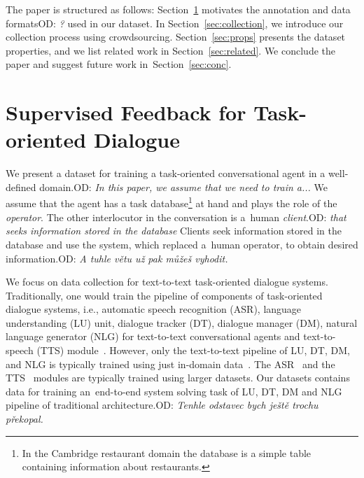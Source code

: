 \documentclass[runningheads,a4paper]{llncs}
\def\OD#1{{\color{darkgreen}OD: \it #1}}
\begin{document}
The paper is structured as follows: Section~\ref{sec:repre} motivates the annotation and data formats\OD{?} used in our dataset.
In Section~\ref{sec:collection}, we introduce our collection process using crowdsourcing.
Section~\ref{sec:props} presents the dataset properties, and we list related work in Section~\ref{sec:related}.
We conclude the paper and suggest future work in~Section~\ref{sec:conc}.


\section{Supervised Feedback for Task-oriented Dialogue} \label{sec:repre}
\vspace{-0.50em}
We present a dataset for training a task-oriented conversational agent in a well-defined domain.\OD{In this paper, we assume that we need to train a...}
We assume that the agent has a task database\footnote{In the Cambridge restaurant domain the database is a simple table containing information about restaurants.} at hand and plays the role of the {\it operator}.
The other interlocutor in the conversation is a~human {\it client}.\OD{that seeks information stored in the database}
Clients seek information stored in the database and use the system, which replaced a~human operator, to obtain desired information.\OD{A tuhle větu už pak můžeš vyhodit.}

We focus on data collection for text-to-text task-oriented dialogue systems.
Traditionally, one would train the pipeline of components of task-oriented dialogue systems, i.e., automatic speech recognition (ASR), language understanding (LU) unit, dialogue tracker (DT), dialogue manager (DM), natural language generator (NLG) for text-to-text conversational agents and text-to-speech (TTS) module~\cite{duvsek2014alex}.
However, only the text-to-text pipeline of LU, DT, DM, and NLG is typically trained using just in-domain data~\cite{gasic2011line,jurvcivcek2014factored,duvsek2016sequence}.
The ASR~\cite{platek2014free} and the TTS~\cite{taylor2009text} modules are typically trained using larger datasets.
Our datasets contains data for training an~end-to-end system solving task of LU, DT, DM and NLG pipeline of traditional architecture.\OD{Tenhle odstavec bych ještě trochu překopal.}
\end{document}
